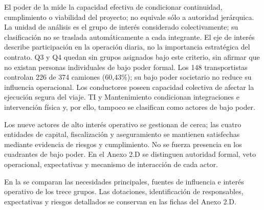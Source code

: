 El poder de la  mide la capacidad efectiva de condicionar continuidad, cumplimiento o viabilidad del proyecto; no equivale sólo a autoridad jerárquica. La unidad de análisis es el grupo de interés considerado colectivamente; su clasificación no se traslada automáticamente a cada integrante. El eje de interés describe participación en la operación diaria, no la importancia estratégica del contrato. Q3 y Q4 quedan sin grupos asignados bajo este criterio, sin afirmar que no existan personas individuales de bajo poder formal. Los 148 transportistas controlan 226 de 374 camiones (60,43\%); su bajo poder societario no reduce su influencia operacional. Los conductores poseen capacidad colectiva de afectar la ejecución segura del viaje. TI y Mantenimiento condicionan integraciones e intervención física y, por ello, tampoco se clasifican como actores de bajo poder.

Los nueve actores de alto interés operativo se gestionan de cerca; las cuatro entidades de capital, fiscalización y aseguramiento se mantienen satisfechas mediante evidencia de riesgos y cumplimiento. No se fuerza presencia en los cuadrantes de bajo poder. En el Anexo 2.D se distinguen autoridad formal, veto operacional, expectativas y mecanismo de interacción de cada actor.

En la  se comparan las necesidades principales, fuentes de influencia e interés operativo de los trece grupos. Las dotaciones, identificación de responsables, expectativas y riesgos detallados se conservan en las fichas del Anexo 2.D.

